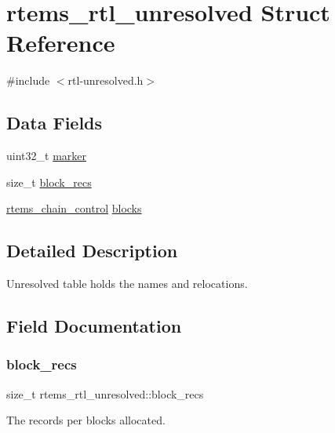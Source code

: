 \hypertarget{structrtems__rtl__unresolved}{}\section{rtems\+\_\+rtl\+\_\+unresolved Struct Reference}
\label{structrtems__rtl__unresolved}


{\ttfamily \#include $<$rtl-\/unresolved.\+h$>$}

\subsection*{Data Fields}
\begin{DoxyCompactItemize}
\item 
uint32\+\_\+t \mbox{\hyperlink{structrtems__rtl__unresolved_a93f2bb571fd25eb1d9cde5ff46a76fd3}{marker}}
\item 
size\+\_\+t \mbox{\hyperlink{structrtems__rtl__unresolved_aa0ceb0a24ed8c15cf3fb4396703df064}{block\+\_\+recs}}
\item 
\mbox{\hyperlink{unionChain__Control}{rtems\+\_\+chain\+\_\+control}} \mbox{\hyperlink{structrtems__rtl__unresolved_a544e214c87a746b5c3589e65ff9a45bb}{blocks}}
\end{DoxyCompactItemize}


\subsection{Detailed Description}
Unresolved table holds the names and relocations. 

\subsection{Field Documentation}
\mbox{\label{structrtems__rtl__unresolved_aa0ceb0a24ed8c15cf3fb4396703df064}} 
\subsubsection{\texorpdfstring{block\_recs}{block\_recs}}
{\footnotesize\ttfamily size\+\_\+t rtems\+\_\+rtl\+\_\+unresolved\+::block\+\_\+recs}

The records per blocks allocated. \mbox{\label{structrtems__rtl__unresolved_a544e214c87a746b5c3589e65ff9a45bb}} 
